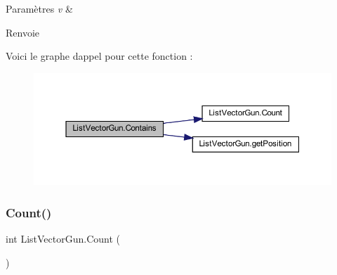 \begin{DoxyParams}{Paramètres}
{\em v} & \\
\hline
\end{DoxyParams}
\begin{DoxyReturn}{Renvoie}

\end{DoxyReturn}
Voici le graphe d\textquotesingle{}appel pour cette fonction \+:
\nopagebreak
\begin{figure}[H]
\begin{center}
\leavevmode
\includegraphics[width=350pt]{class_list_vector_gun_a6cff6d5a51a605010ca4ced8ef89e8c2_cgraph}
\end{center}
\end{figure}
\mbox{\label{class_list_vector_gun_a7c7706a2171becc86a8353b525d35d69}} 
\subsubsection{\texorpdfstring{Count()}{Count()}}
{\footnotesize\ttfamily int List\+Vector\+Gun.\+Count (\begin{DoxyParamCaption}{ }\end{DoxyParamCaption})\hspace{0.3cm}{\ttfamily [inline]}}





